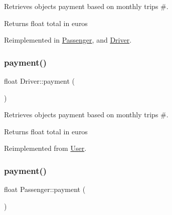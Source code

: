 Retrieves object\textquotesingle{}s payment based on monthly trips \#. 

\begin{DoxyReturn}{Returns}
float total in euros 
\end{DoxyReturn}


Reimplemented in \hyperlink{group___user_ga9535b6486d1f33f055d6c7385780ec68}{Passenger}, and \hyperlink{group___user_ga3e6ec3270b94d43b3865b326e5bcd381}{Driver}.

\mbox{\label{group___user_ga3e6ec3270b94d43b3865b326e5bcd381}} 
\subsubsection{\texorpdfstring{payment()}{payment()}\hspace{0.1cm}{\footnotesize\ttfamily [2/3]}}
{\footnotesize\ttfamily float Driver\+::payment (\begin{DoxyParamCaption}{ }\end{DoxyParamCaption})\hspace{0.3cm}{\ttfamily [virtual]}}



Retrieves object\textquotesingle{}s payment based on monthly trips \#. 

\begin{DoxyReturn}{Returns}
float total in euros 
\end{DoxyReturn}


Reimplemented from \hyperlink{group___user_gac8563338d1d8086cd5485ad8c1ed4499}{User}.

\mbox{\label{group___user_ga9535b6486d1f33f055d6c7385780ec68}} 
\subsubsection{\texorpdfstring{payment()}{payment()}\hspace{0.1cm}{\footnotesize\ttfamily [3/3]}}
{\footnotesize\ttfamily float Passenger\+::payment (\begin{DoxyParamCaption}{ }\end{DoxyParamCaption})\hspace{0.3cm}{\ttfamily [virtual]}}



